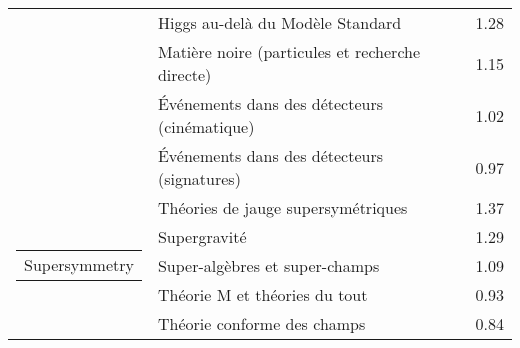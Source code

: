 \begin{longtable}[H]{p{}|p{}|p{}}
                                             & Higgs au-delà du Modèle Standard &  1.28 \\
                                             & Matière noire (particules et recherche directe) &  1.15 \\
                                             & Événements dans des détecteurs (cinématique) &  1.02 \\
                                             & Événements dans des détecteurs (signatures) &  0.97 \\
\cline{1-3}
\multirow{5}{*}{\begin{tabular}{l}Supersymmetry\end{tabular}} & Théories de jauge supersymétriques &  1.37 \\
                                             & Supergravité &  1.29 \\
                                             & Super-algèbres et super-champs &  1.09 \\
                                             & Théorie M et théories du tout &  0.93 \\
                                             & Théorie conforme des champs &  0.84 \\
\end{longtable}
